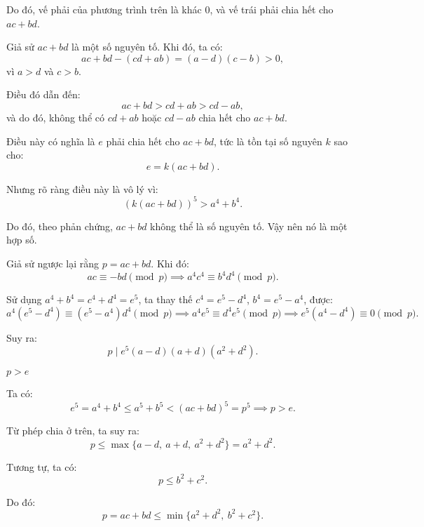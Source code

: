 \begin{problem}
\begin{soln}
    Do đó, vế phải của phương trình trên là khác 0, và vế trái phải chia hết cho \( ac + bd \).

    Giả sử \( ac + bd \) là một số nguyên tố.
    Khi đó, ta có:
    \[
        ac + bd - (cd + ab) = (a - d)(c - b) > 0,
    \]
    vì \( a > d \) và \( c > b \).

    Điều đó dẫn đến:
    \[
        ac + bd > cd + ab > cd - ab,
    \]
    và do đó, không thể có \( cd + ab \) hoặc \( cd - ab \) chia hết cho \( ac + bd \).
    
    Điều này có nghĩa là \( e \) phải chia hết cho \( ac + bd \), tức là tồn tại số nguyên \( k \) sao cho:
    \[
        e = k(ac + bd).
    \]

    Nhưng rõ ràng điều này là vô lý vì:
    \[
        (k(ac + bd))^5 > a^4 + b^4.
    \]

    Do đó, theo phản chứng, \( ac + bd \) không thể là số nguyên tố. Vậy nên nó là một hợp số.
\end{soln}

\begin{soln}\footnotemark
    Giả sử ngược lại rằng \( p = ac + bd \). Khi đó:
    \[
        ac \equiv -bd \pmod{p}
        \implies a^4 c^4 \equiv b^4 d^4 \pmod{p}.
    \]

    Sử dụng \( a^4 + b^4 = c^4 + d^4 = e^5 \), ta thay thế \( c^4 = e^5 - d^4 \), \( b^4 = e^5 - a^4 \), được:
    \[
        a^4 (e^5 - d^4) \equiv (e^5 - a^4) d^4 \pmod{p}
        \implies a^4 e^5 \equiv d^4 e^5 \pmod{p}
        \implies e^5 (a^4 - d^4) \equiv 0 \pmod{p}.
    \]

    Suy ra:
    \[
        p \mid e^5 (a - d)(a + d)(a^2 + d^2).
    \]

    \begin{claim*}
        \( p > e \)
    \end{claim*}
    \begin{subproof}
        Ta có:
        \[
            e^5 = a^4 + b^4 \le a^5 + b^5 < (ac + bd)^5 = p^5 \implies p > e.
        \]
    \end{subproof}

    Từ phép chia ở trên, ta suy ra:
    \[
        p \le \max\{a - d,\ a + d,\ a^2 + d^2\} = a^2 + d^2.
    \]

    Tương tự, ta có:
    \[
        p \le b^2 + c^2.
    \]

    Do đó:
    \[
        p = ac + bd \le \min\{a^2 + d^2,\ b^2 + c^2\}.
    \]


\end{soln}
\end{problem}
